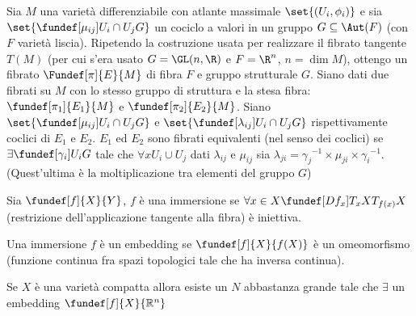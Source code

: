
\newcommand*\tc{\ \text{t.c.} \ } %
\newcommand*\dual{{^\ast}} %
\newcommand*\base[1][B]{\mathcal{#1}} %

\begin{defn}
Sia $M$ una varietà differenziabile con atlante massimale $\set{(U_i, \phi_i)}$ e sia $\set{ \fundef[\mu_{ij}]{U_i \cap U_j}{G} }$ un cociclo a valori in un gruppo $G \subseteq \Aut(F)$ (con $F$ varietà liscia). Ripetendo la costruzione usata per realizzare il fibrato tangente $T(M)$ (per cui s'era usato $G = \GL(n, \R)$ e $F=\R^n$, $n = \dim M$), ottengo un fibrato $\Fundef[\pi]{E}{M}$ di fibra $F$ e gruppo strutturale $G$.
Siano dati due fibrati su $M$ con lo stesso gruppo di struttura e la stesa fibra: $\fundef[\pi_1]{E_1}{M}$ e  $\fundef[\pi_2]{E_2}{M}$.
Siano $\set{ \fundef[\mu_{ij}]{U_i \cap U_j}{G} }$ e $\set{ \fundef[\lambda_{ij}]{U_i \cap U_j}{G} }$ rispettivamente coclici di $E_1$ e $E_2$.
$E_1$ ed $E_2$ sono fibrati equivalenti (nel senso dei coclici) se $\exists \fundef[\gamma_{i}]{U_i}{G}$ tale che $\forall x U_i \cup U_j$ dati $\lambda_{ij}$ e $\mu_{ij}$
sia $\lambda_{ji} = {\gamma_j}^{-1} \times \mu_{ji} \times  {\gamma_i}^{-1}$.  (Quest'ultima è la moltiplicazione tra elementi del gruppo $G$)
\end{defn}

\begin{defn}
Sia $\fundef[f]{X}{Y}$, $f$ è una immersione se $\forall x \in X \fundef[Df_{x}]{T_{x}X}{T_{f(x)} X}$ (restrizione dell'applicazione tangente alla fibra) è iniettiva.
\end{defn}

\begin{defn}[Embedding] 
 Una immersione $f$ è un embedding se $\fundef[f]{X}{f(X)}$  è un omeomorfismo (funzione continua fra spazi topologici tale che ha inversa continua).
\end{defn}



\begin{teo}
 Se $X$ è una varietà compatta allora esiste un $N$ abbastanza grande tale che $\exists$ un embedding $\fundef[f]{X}{\mathbb{R}^{n}}$
\end{teo}


